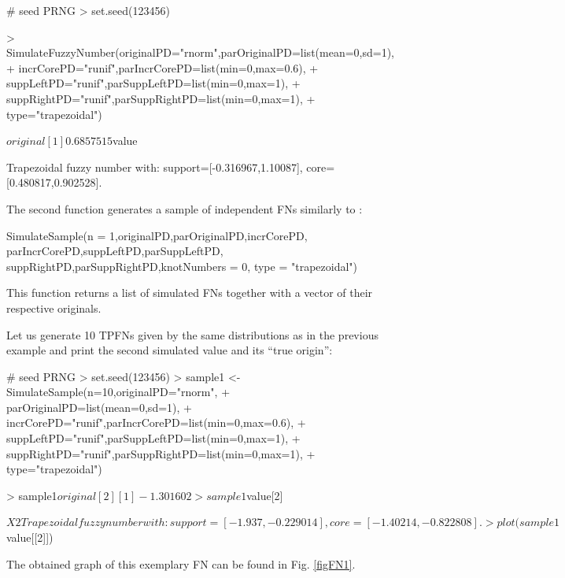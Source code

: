 \begin{example}
# seed PRNG
> set.seed(123456)

> SimulateFuzzyNumber(originalPD="rnorm",parOriginalPD=list(mean=0,sd=1),
+  incrCorePD="runif",parIncrCorePD=list(min=0,max=0.6),
+  suppLeftPD="runif",parSuppLeftPD=list(min=0,max=1),
+  suppRightPD="runif",parSuppRightPD=list(min=0,max=1),
+  type="trapezoidal")

$original

[1] 0.6857515

$value

Trapezoidal fuzzy number with:
   support=[-0.316967,1.10087],
   core=[0.480817,0.902528].
\end{example}

The second function generates a sample of  independent FNs similarly to :

\begin{example}
SimulateSample(n = 1,originalPD,parOriginalPD,incrCorePD,
  parIncrCorePD,suppLeftPD,parSuppLeftPD,
  suppRightPD,parSuppRightPD,knotNumbers = 0,
  type = "trapezoidal")
\end{example}

This function returns a list of simulated FNs together with a vector of their respective originals.

Let us generate 10 TPFNs given by the same distributions as in the previous example and print the second simulated value and its ``true origin'':

\begin{example}
# seed PRNG
> set.seed(123456)
> sample1 <- SimulateSample(n=10,originalPD="rnorm",
+  parOriginalPD=list(mean=0,sd=1),
+  incrCorePD="runif",parIncrCorePD=list(min=0,max=0.6),
+  suppLeftPD="runif",parSuppLeftPD=list(min=0,max=1),
+  suppRightPD="runif",parSuppRightPD=list(min=0,max=1),
+  type="trapezoidal")

> sample1$original[2]

[1] -1.301602

> sample1$value[2]

$X2

Trapezoidal fuzzy number with:
   support=[-1.937,-0.229014],
   core=[-1.40214,-0.822808].

> plot(sample1$value[[2]])
\end{example}

The obtained graph of this exemplary FN can be found in Fig. \ref{figFN1}.


